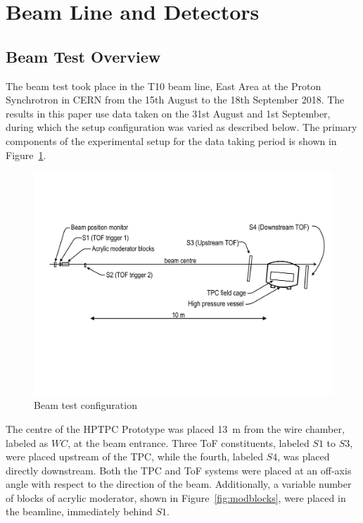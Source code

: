 \section{Beam Line and Detectors}
\label{hptpcPaper:sec:Methods}

    \subsection{Beam Test Overview}
    The beam test took place in the T10 beam line, East Area at the Proton Synchrotron in CERN from the 15th August to the 18th September 2018.
    The results in this paper use data taken on the 31st August and 1st September, during which the setup configuration was varied as described below.
    The primary components of the  experimental setup for the data taking period is shown in Figure~\ref{fig:setup}.
    \begin{figure}
    \includegraphics[width=1.0\linewidth]{files/Figures/T10Diagram.pdf}
    	\caption{Beam test configuration}
    		\label{fig:setup}
    \end{figure}
    The centre of the HPTPC Prototype was placed 13~m from the wire chamber, labeled as $WC$, at the beam entrance. Three ToF constituents, labeled $S1$ to $S3$, were placed upstream of the TPC, while the fourth, labeled $S4$, was placed directly downstream. Both the TPC and ToF systems were placed at an off-axis angle with respect to the direction of the beam.
    Additionally, a variable number of blocks of acrylic moderator, shown in Figure~\ref{fig:modblocks}, were placed in the beamline, immediately behind $S1$.
    
